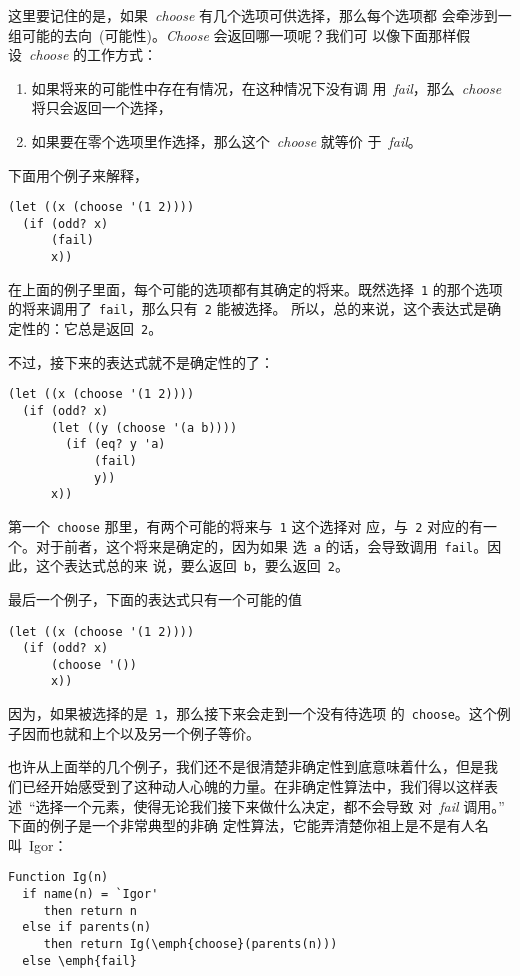 这里要记住的是，如果~\emph{choose} 有几个选项可供选择，那么每个选项都
会牵涉到一组可能的去向~(可能性)。\emph{Choose} 会返回哪一项呢？我们可
以像下面那样假设~\emph{choose} 的工作方式：
\begin{enumerate}
\item 如果将来的可能性中存在有情况，在这种情况下没有调
  用~\emph{fail}，那么~\emph{choose} 将只会返回一个选择，
\item 如果要在零个选项里作选择，那么这个~\emph{choose} 就等价
  于~\emph{fail}。
\end{enumerate}

下面用个例子来解释，
\begin{lstlisting}
(let ((x (choose '(1 2))))
  (if (odd? x)
      (fail)
      x))
\end{lstlisting}
在上面的例子里面，每个可能的选项都有其确定的将来。既然选择~\texttt{1}
的那个选项的将来调用了~\texttt{fail}，那么只有~\texttt{2} 能被选择。
所以，总的来说，这个表达式是确定性的：它总是返回~\texttt{2}。

不过，接下来的表达式就不是确定性的了：
\begin{lstlisting}
(let ((x (choose '(1 2))))
  (if (odd? x)
      (let ((y (choose '(a b))))
        (if (eq? y 'a)
            (fail)
            y))
      x))
\end{lstlisting}
第一个~\texttt{choose} 那里，有两个可能的将来与~\texttt{1} 这个选择对
应，与~\texttt{2} 对应的有一个。对于前者，这个将来是确定的，因为如果
选~\texttt{a} 的话，会导致调用~\texttt{fail}。因此，这个表达式总的来
说，要么返回~\texttt{b}，要么返回~\texttt{2}。

最后一个例子，下面的表达式只有一个可能的值
\begin{lstlisting}
(let ((x (choose '(1 2))))
  (if (odd? x)
      (choose '())
      x))
\end{lstlisting}
因为，如果被选择的是~\texttt{1}，那么接下来会走到一个没有待选项
的~\texttt{choose}。这个例子因而也就和上个以及另一个例子等价。

也许从上面举的几个例子，我们还不是很清楚非确定性到底意味着什么，但是我
们已经开始感受到了这种动人心魄的力量。在非确定性算法中，我们得以这样表
述~``选择一个元素，使得无论我们接下来做什么决定，都不会导致
对~\emph{fail} 调用。'' 下面的例子是一个非常典型的非确
定性算法，它能弄清楚你祖上是不是有人名叫~Igor：

\begin{lstlisting}
Function Ig(n)
  if name(n) = `Igor'
     then return n
  else if parents(n)
     then return Ig(\emph{choose}(parents(n)))
  else \emph{fail}
\end{lstlisting}

